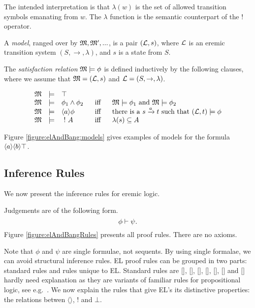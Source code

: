 \NI The intended interpretation is that $\lambda(w)$ is the set of allowed
transition symbols emanating from $w$.  The $\lambda$ function is the
semantic counterpart of the $!$ operator.

\begin{definition}
A \emph{model}, ranged over by $\frak{M}, \frak{M}', ...$, is a pair $(\mathcal{L},
s)$, where $\mathcal{L}$ is an eremic transition system $(S, \rightarrow,
\lambda)$, and $s$ is a state from $S$.
\end{definition}



\begin{definition}
The \emph{satisfaction relation} $\frak{M} \models \phi$ is defined
inductively by the following clauses, where we assume that $\frak{M} =
(\mathcal{L}, s)$ and $\mathcal{L} = (S, \rightarrow, \lambda)$.

\[
\begin{array}{lclcl}
  \MMM & \models & \top   \\
  \MMM & \models & \phi_1 \AND \phi_2 &\ \mbox{ iff } \ & \MMM  \models \phi_1 \mbox { and } \MMM \models \phi_2  \\
  \MMM & \models & \langle a \rangle \phi & \mbox{ iff } & \text{there is a } s \xrightarrow{a} t \mbox { such that } (\LLL, t) \models \phi  \\
  \MMM & \models & \fBang A &\mbox{ iff } & \lambda(s) \subseteq A
\end{array}
\]

\end{definition}

\NI Figure \ref{figure:elAndBang:models} gives examples of models for
the formula $\langle a \rangle \langle b \rangle \top$. 

\subsection{Inference Rules}



\NI We now present the inference rules for eremic logic. 

\begin{definition} Judgements are of the following form.
\[
  \phi \vdash \psi.
\]
Figure \ref{figure:elAndBangRules} presents all proof rules. There are
no axioms.
\end{definition}

\NI Note that $\phi$ and $\psi$ are single formulae, not sequents.  By
using single formalae, we can avoid structural inference rules.  EL
proof rules can be grouped in two parts: standard rules and rules
unique to EL.  Standard rules are [],
[], [],
[], [],
[] and [] hardly need
explanation as they are variants of familiar rules for propositional
logic, see e.g.~\cite{TroelstraAS:basprot,vanDalenD:logstr}.  We now
explain the rules that give EL's its distinctive properties: the
relations betwen $\langle \rangle$, $!$ and $\bot$.

